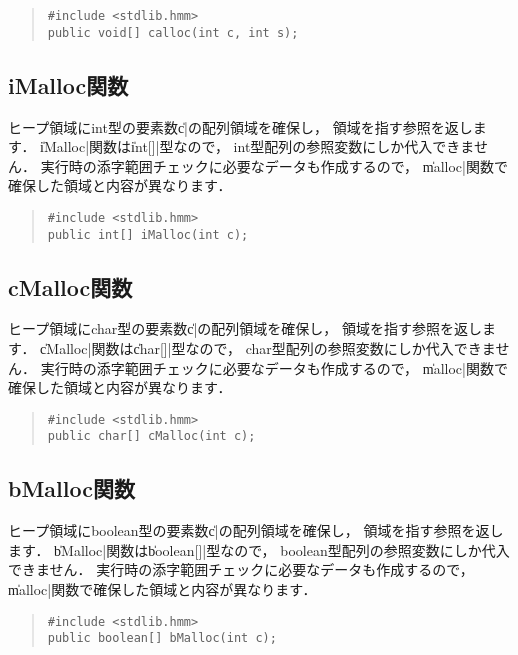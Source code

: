 \begin{quote}
\begin{verbatim}
#include <stdlib.hmm>
public void[] calloc(int c, int s);
\end{verbatim}
\end{quote}

\subsection{iMalloc関数}

ヒープ領域にint型の要素数\|c|の配列領域を確保し，
領域を指す参照を返します．
\|iMalloc|関数は\|int[]|型なので，
int型配列の参照変数にしか代入できません．
実行時の添字範囲チェックに必要なデータも作成するので，
\|malloc|関数で確保した領域と内容が異なります．

\begin{quote}
\begin{verbatim}
#include <stdlib.hmm>
public int[] iMalloc(int c);
\end{verbatim}
\end{quote}

\subsection{cMalloc関数}

ヒープ領域にchar型の要素数\|c|の配列領域を確保し，
領域を指す参照を返します．
\|cMalloc|関数は\|char[]|型なので，
char型配列の参照変数にしか代入できません． 
実行時の添字範囲チェックに必要なデータも作成するので，
\|malloc|関数で確保した領域と内容が異なります．

\begin{quote}
\begin{verbatim}
#include <stdlib.hmm>
public char[] cMalloc(int c);
\end{verbatim}
\end{quote}

\subsection{bMalloc関数}

ヒープ領域にboolean型の要素数\|c|の配列領域を確保し，
領域を指す参照を返します．
\|bMalloc|関数は\|boolean[]|型なので，
boolean型配列の参照変数にしか代入できません．
実行時の添字範囲チェックに必要なデータも作成するので，
\|malloc|関数で確保した領域と内容が異なります．

\begin{quote}
\begin{verbatim}
#include <stdlib.hmm>
public boolean[] bMalloc(int c);
\end{verbatim}
\end{quote}

